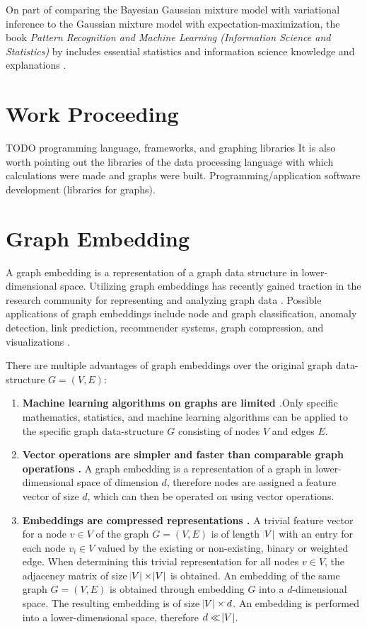 \documentclass[conference]{IEEEtran}
\begin{document}
On part of comparing the Bayesian Gaussian mixture model with variational inference to the Gaussian mixture model with expectation-maximization, the \citeyear{Bishop06} book \textit{Pattern Recognition and Machine Learning (Information Science and Statistics)} by \citeauthor{Bishop06} includes essential statistics and information science knowledge and explanations \cite{Bishop06}.

\section{Work Proceeding}

TODO programming language, frameworks, and graphing libraries
It is also worth pointing out the libraries of the data processing language with which calculations were made and graphs were built.
Programming/application software development (libraries for graphs).


\section{Graph Embedding}

A graph embedding is a representation of a graph data structure in lower-dimensional space. Utilizing graph embeddings has recently gained traction in the research community for representing and analyzing graph data \cite{Goyal_2018}. Possible applications of graph embeddings include node and graph classification, anomaly detection, link prediction, recommender systems, graph compression, and visualizations \cite{rossi20tkdd-roles}.

There are multiple advantages of graph embeddings over the original graph data-structure $G = (V, E)$:

\begin{enumerate}
    \item \textbf{Machine learning algorithms on graphs are limited \cite{Godec2018}}.Only specific mathematics, statistics, and machine learning algorithms can be applied to the specific graph data-structure $G$ consisting of nodes $V$ and edges $E$.
    \item \textbf{Vector operations are simpler and faster than comparable graph operations \cite{Godec2018}.} A graph embedding is a representation of a graph in lower-dimensional space of dimension $d$, therefore nodes are assigned a feature vector of size $d$, which can then be operated on using vector operations.
    \item \textbf{Embeddings are compressed representations \cite{Godec2018}.} A trivial feature vector for a node $v \in V$ of the graph $G = (V, E)$ is of length $\abs{V}$ with an entry for each node $v_i \in V$ valued by the existing or non-existing, binary or weighted edge. When determining this trivial representation for all nodes $v \in V$, the adjacency matrix of size $\abs{V} \times \abs{V}$ is obtained. An embedding of the same graph $G = (V, E)$ is obtained through embedding $G$ into a $d$-dimensional space. The resulting embedding is of size $\abs{V} \times d$. An embedding is performed into a lower-dimensional space, therefore $d \ll \abs{V}$.
\end{enumerate}
\end{document}
